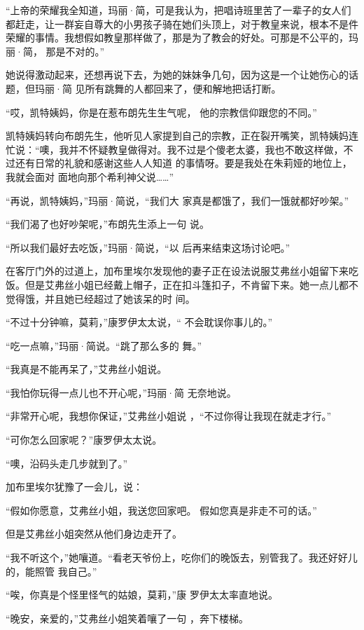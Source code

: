 \documentclass{article}
\begin{document}
“上帝的荣耀我全知道，玛丽·简，可是我认为，把唱诗班里苦了一辈子的女人们都赶走，让一群妄自尊大的小男孩子骑在她们头顶上，对于教皇来说，根本不是件荣耀的事情。我想假如教皇那样做了，那是为了教会的好处。可那是不公平的，玛丽·简，
那是不对的。” 

她说得激动起来，还想再说下去，为她的妹妹争几句，因为这是一个让她伤心的话题，但玛丽·简
见所有跳舞的人都回来了，便和解地把话打断。 

“哎，凯特姨妈，你是在惹布朗先生生气呢，
他的宗教信仰跟您的不同。” 

凯特姨妈转向布朗先生，他听见人家提到自己的宗教，正在裂开嘴笑，凯特姨妈连忙说：“噢，我并不怀疑教皇做得对。我不过是个傻老太婆，我也不敢这样做，不过还有日常的礼貌和感谢这些人人知道
\newpage
的事情呀。要是我处在朱莉娅的地位上，我就会面对
面地向那个希利神父说……” 

“再说，凯特姨妈，”玛丽·简说，“我们大
家真是都饿了，我们一饿就都好吵架。” 

“我们渴了也好吵架呢，”布朗先生添上一句
说。 

“所以我们最好去吃饭，”玛丽·简说，“以
后再来结束这场讨论吧。” 

在客厅门外的过道上，加布里埃尔发现他的妻子正在设法说服艾弗丝小姐留下来吃饭。但是艾弗丝小姐已经戴上帽子，正在扣斗篷扣子，不肯留下来。她一点儿都不觉得饿，并且她已经超过了她该呆的时
间。 

“不过十分钟嘛，莫莉，”康罗伊太太说，“
不会耽误你事儿的。” 

\newpage

“吃一点嘛，”玛丽·简说。“跳了那么多的
舞。” 


“我真是不能再呆了，”艾弗丝小姐说。 

“我怕你玩得一点儿也不开心呢，”玛丽·简
无奈地说。 

“非常开心呢，我想你保证，”艾弗丝小姐说
，“不过你得让我现在就走才行。” 


“可你怎么回家呢？”康罗伊太太说。 


“噢，沿码头走几步就到了。” 


加布里埃尔犹豫了一会儿，说： 

“假如你愿意，艾弗丝小姐，我送您回家吧。
假如您真是非走不可的话。” 


\newpage

但是艾弗丝小姐突然从他们身边走开了。 

“我不听这个，”她嚷道。“看老天爷份上，吃你们的晚饭去，别管我了。我还好好儿的，能照管
我自己。” 

“唉，你真是个怪里怪气的姑娘，莫莉，”康
罗伊太太率直地说。 

“晚安，亲爱的，”艾弗丝小姐笑着嚷了一句
，奔下楼梯。 
\end{document}
